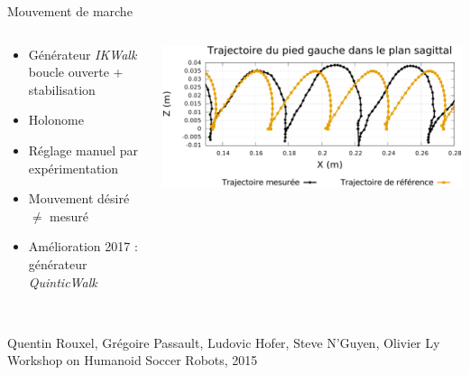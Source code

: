 
\begin{frame}[noframenumbering]{Mouvement de marche}
    \begin{columns}
        \begin{column}{0.4\textwidth}
            \begin{itemize}
                \item Générateur \textit{IKWalk} boucle ouverte + stabilisation
                \item Holonome
                \item Réglage manuel par expérimentation
                \item Mouvement désiré $\neq$ mesuré
                \item Amélioration 2017 : générateur \textit{QuinticWalk}
            \end{itemize}
        \end{column}
        \begin{column}{0.6\textwidth}
            \centering
            \includegraphics[type=pdf,ext=.pdf,read=.pdf,width=1.0\linewidth]{../plot/walk_traj_foot}
        \end{column}
    \end{columns}
    \vspace{0.2cm}
    \begin{block}{}
        \\
        \scriptsize
        Quentin Rouxel, Grégoire Passault, Ludovic Hofer, Steve N'Guyen, Olivier Ly\\
        Workshop on Humanoid Soccer Robots, 2015\\
    \end{block}
\end{frame}

